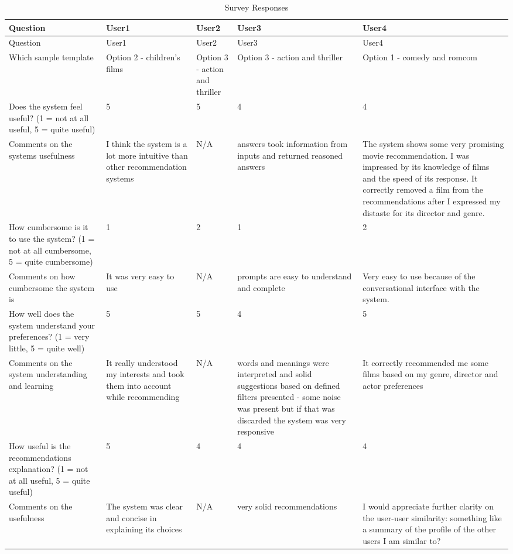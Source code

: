 \begin{longtable}{|p{4cm}|p{3cm}|p{3cm}|p{3cm}|p{3cm}|}
\caption{Survey Responses}\\
\hline
Question & User1 & User2 & User3 & User4 \\
\hline
\endfirsthead
\hline
Question & User1 & User2 & User3 & User4 \\
\hline
\endhead
Which sample template & Option 2 - children's films & Option 3 - action and thriller & Option 3 - action and thriller & Option 1 - comedy and romcom \\
\hline
Does the system feel useful? (1 = not at all useful, 5 = quite useful) & 5 & 5 & 4 & 4 \\
\hline
Comments on the systems usefulness & I think the system is a lot more intuitive than other recommendation systems  & N/A & answers took information from inputs and returned reasoned answers & The system shows some very promising movie recommendation. I was impressed by its knowledge of films and the speed of its response. It correctly removed a film from the recommendations after I expressed my distaste for its director and genre.  \\
\hline
How cumbersome is it to use the system? (1 = not at all cumbersome, 5 = quite cumbersome) & 1 & 2 & 1 & 2 \\
\hline
Comments on how cumbersome the system is & It was very easy to use & N/A & prompts are easy to understand and complete & Very easy to use because of the conversational interface with the system. \\
\hline
How well does the system understand your preferences? (1 = very little, 5 = quite well) & 5 & 5 & 4 & 5 \\
\hline
Comments on the system understanding and learning & It really understood my interests and took them into account while recommending  & N/A & words and meanings were interpreted and solid suggestions based on defined filters presented - some noise was present but if that was discarded the system was very responsive   & It correctly recommended me some films based on my genre, director and actor preferences \\
\hline
How useful is the recommendations explanation? (1 = not at all useful, 5 = quite useful) & 5 & 4 & 4 & 4 \\
\hline
Comments on the usefulness & The system was clear and concise in explaining its choices & N/A & very solid recommendations  & I would appreciate further clarity on the user-user similarity: something like a summary of the profile of the other users I am similar to? \\

\end{longtable}
